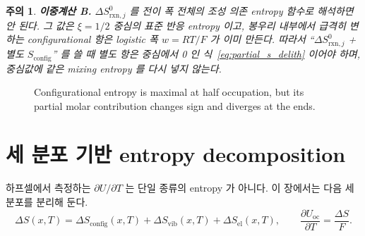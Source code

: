 \documentclass[11pt,a4paper]{article}
\newtheorem*{warnbox}{주의}
\newcommand{\rxn}{\mathrm{rxn}}
\newcommand{\oc}{\mathrm{oc}}
\newcommand{\config}{\mathrm{config}}
\newcommand{\vib}{\mathrm{vib}}
\newcommand{\el}{\mathrm{el}}
\begin{document}
\begin{warnbox}
\textbf{이중계산 B.} $\Delta S_{\rxn,j}^0$ 를 전이 폭 전체의 조성 의존 entropy 함수로 해석하면 안 된다.
그 값은 $\xi=1/2$ 중심의 표준 반응 entropy 이고, 봉우리 내부에서 급격히 변하는 configurational
항은 logistic 폭 $w=RT/F$ 가 이미 만든다. 따라서
``$\Delta S_{\rxn,j}^0$ + 별도 $S_{\config}$'' 를 쓸 때 별도 항은 중심에서 0 인 식~\eqref{eq:partial_s_delith}
이어야 하며, 중심값에 같은 mixing entropy 를 다시 넣지 않는다.
\end{warnbox}

\begin{figure}[t]
\centering
{}
\caption{Configurational entropy is maximal at half occupation, but its partial
molar contribution changes sign and diverges at the ends.}
\label{fig:sconfig}
\end{figure}

\section{세 분포 기반 entropy decomposition}
\label{sec:entropy_decomp}
하프셀에서 측정하는 $\partial U/\partial T$ 는 단일 종류의 entropy 가 아니다. 이 장에서는 다음 세
분포를 분리해 둔다.
\begin{equation}
\Delta S(x,T)=\Delta S_{\config}(x,T)+\Delta S_{\vib}(x,T)+\Delta S_{\el}(x,T),
\qquad
\frac{\partial U_\oc}{\partial T}=\frac{\Delta S}{F}.
\label{eq:three_entropy}
\end{equation}
\end{document}

